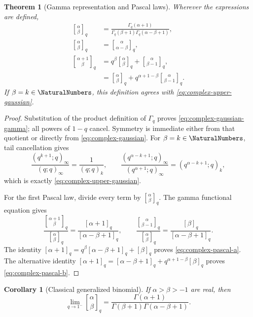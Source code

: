 \documentclass[11pt,a4paper,oneside,openany]{book}
\newtheorem{theorem}{Theorem}[chapter]
\newtheorem{corollary}[corollary]{Corollary}
\theoremstyle{definition}
\theoremstyle{remark}
\begin{document}
\begin{theorem}[Gamma representation and Pascal laws]\label{thm:complex-gaussian-properties}
Wherever the expressions are defined,
\begin{align}
 \genfrac{[}{]}{0pt}{}{\alpha}{\beta}_q
 &=\frac{\Gamma_q(\alpha+1)}
 {\Gamma_q(\beta+1)\Gamma_q(\alpha-\beta+1)},
 \tag{17.9}\label{eq:complex-gaussian-gamma}\\
 \genfrac{[}{]}{0pt}{}{\alpha}{\beta}_q
 &=\genfrac{[}{]}{0pt}{}{\alpha}{\alpha-\beta}_q,
 \tag{17.10}\label{eq:complex-gaussian-symmetry}\\
 \genfrac{[}{]}{0pt}{}{\alpha+1}{\beta}_q
 &=q^\beta\genfrac{[}{]}{0pt}{}{\alpha}{\beta}_q
   +\genfrac{[}{]}{0pt}{}{\alpha}{\beta-1}_q,
 \tag{17.11}\label{eq:complex-pascal-a}\\
 &=\genfrac{[}{]}{0pt}{}{\alpha}{\beta}_q
   +q^{\alpha+1-\beta}
    \genfrac{[}{]}{0pt}{}{\alpha}{\beta-1}_q.
 \tag{17.12}\label{eq:complex-pascal-b}
\end{align}
If $\beta=k\in\NaturalNumbers$, this definition agrees with \eqref{eq:complex-upper-gaussian}.
\end{theorem}

\begin{proof}
Substitution of the product definition of $\Gamma_q$ proves \eqref{eq:complex-gaussian-gamma}; all powers of $1-q$ cancel.  Symmetry is immediate either from that quotient or directly from \eqref{eq:complex-gaussian}.  For $\beta=k\in\NaturalNumbers$, tail cancellation gives
\[
 \frac{(q^{k+1};q)_\infty}{(q;q)_\infty}
 =\frac1{(q;q)_k},
 \qquad
 \frac{(q^{\alpha-k+1};q)_\infty}
 {(q^{\alpha+1};q)_\infty}
 =(q^{\alpha-k+1};q)_k,
\]
which is exactly \eqref{eq:complex-upper-gaussian}.

For the first Pascal law, divide every term by
$\genfrac{[}{]}{0pt}{}{\alpha}{\beta}_q$.  The gamma functional equation gives
\[
 \frac{\genfrac{[}{]}{0pt}{}{\alpha+1}{\beta}_q}
      {\genfrac{[}{]}{0pt}{}{\alpha}{\beta}_q}
 =\frac{[\alpha+1]_q}{[\alpha-\beta+1]_q},
 \qquad
 \frac{\genfrac{[}{]}{0pt}{}{\alpha}{\beta-1}_q}
      {\genfrac{[}{]}{0pt}{}{\alpha}{\beta}_q}
 =\frac{[\beta]_q}{[\alpha-\beta+1]_q}.
\]
The identity
\(
 [\alpha+1]_q=q^\beta[\alpha-\beta+1]_q+[\beta]_q
\)
proves \eqref{eq:complex-pascal-a}.  The alternative identity
\(
 [\alpha+1]_q=[\alpha-\beta+1]_q
 +q^{\alpha+1-\beta}[\beta]_q
\)
proves \eqref{eq:complex-pascal-b}.
\end{proof}

\begin{corollary}[Classical generalized binomial]\label{cor:complex-gaussian-classical}
If $\alpha>\beta>-1$ are real, then
\[
 \lim_{q\to1^-}\genfrac{[}{]}{0pt}{}{\alpha}{\beta}_q
 =\frac{\Gamma(\alpha+1)}
 {\Gamma(\beta+1)\Gamma(\alpha-\beta+1)}.
\]
\end{corollary}
\end{document}
